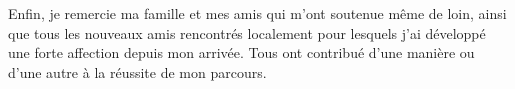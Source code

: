 \documentclass[a4paper,12pt,bibliography=totoc,index=totoc,twoside,francais]{scrbook}
\let\Oldgls\gls%
\renewcommand{\gls}[1]{%
\textbf{\Oldgls{#1}}%
}
\begin{document}
Enfin, je remercie ma famille et mes amis qui m'ont soutenue même de loin, ainsi que tous les nouveaux amis rencontrés localement pour lesquels j'ai développé une forte affection depuis mon arrivée. Tous ont contribué d'une manière ou d'une autre à la réussite de mon parcours.


\tableofcontents
\listoffigures

\mainmatter




%





%
%

\backmatter

\printindex

\glsaddall

\printglossary[type=acronym,title=Acronymes,toctitle=Acronymes]
\printglossary[type=main,title=Glossaire,toctitle=Glossaire]

\printbibliography

\cleardoublepage

\end{document}
